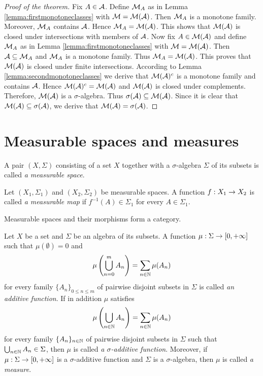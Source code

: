 \begin{proof}[Proof of the theorem]
Fix $A\in {\mathcal A}$. Define ${\mathcal M}_A$ as in Lemma \ref{lemma:firstmonotoneclasses} with ${\mathcal M} = {\mathcal M}({\mathcal A})$. Then ${\mathcal M}_A$ is a monotone family. Moreover, ${\mathcal M}_A$ contains ${\mathcal A}$. Hence ${\mathcal M}_A={\mathcal M}({\mathcal A})$. This shows that ${\mathcal M}({\mathcal A})$ is closed under intersections with members of ${\mathcal A}$. Now fix $A\in {\mathcal M}({\mathcal A})$ and define ${\mathcal M}_A$ as in Lemma \ref{lemma:firstmonotoneclasses} with ${\mathcal M} = {\mathcal M}({\mathcal A})$. Then ${\mathcal A}\subseteq {\mathcal M}_A$ and ${\mathcal M}_A$ is a monotone family. Thus ${\mathcal M}_A={\mathcal M}({\mathcal A})$. This proves that ${\mathcal M}({\mathcal A})$ is closed under finite intersections. According to Lemma \ref{lemma:secondmonotoneclasses} we derive that ${\mathcal M}({\mathcal A})^c$ is a monotone family and contains ${\mathcal A}$. Hence ${\mathcal M}({\mathcal A})^c={\mathcal M}({\mathcal A})$ and ${\mathcal M}({\mathcal A})$ is closed under complements. Therefore, ${\mathcal M}({\mathcal A})$ is a $\sigma$-algebra. Thus $\sigma({\mathcal A})\subseteq {\mathcal M}({\mathcal A})$. Since it is clear that ${\mathcal M}({\mathcal A})\subseteq \sigma({\mathcal A})$, we derive that ${\mathcal M}({\mathcal A})=\sigma({\mathcal A})$.
\end{proof}

\section{Measurable spaces and measures}

\begin{definition}
A pair $(X,\Sigma)$ consisting of a set $X$ together with a $\sigma$-algebra $\Sigma$ of its subsets is called \textit{a measurable space}.
\end{definition}

\begin{definition}
Let $(X_1,\Sigma_1)$ and $(X_2,\Sigma_2)$ be measurable spaces. A function $f:X_1\rightarrow X_2$ is called \textit{a measurable map} if $f^{-1}(A)\in \Sigma_1$ for every $A\in \Sigma_1$.
\end{definition}
\noindent
Measurable spaces and their morphisms form a category. 

\begin{definition}
Let $X$ be a set and $\Sigma$ be an algebra of its subsets. A function $\mu:\Sigma \rightarrow [0,+\infty]$ such that $\mu(\emptyset)=0$ and 
$$\mu\left(\bigcup_{n=0}^mA_n\right)=\sum_{n\in {\mathbb N}}\mu(A_n)$$
for every family  $\{A_n\}_{0\leq n\leq m}$ of pairwise disjoint subsets in $\Sigma$ is called \textit{an additive function}. If in addition $\mu$ satisfies
$$\mu\left(\bigcup_{n\in {\mathbb N}}A_n\right)=\sum_{n\in {\mathbb N}}\mu(A_n)$$
for every family  $\{A_n\}_{n\in {\mathbb N}}$ of pairwise disjoint subsets in $\Sigma$ such that $\bigcup_{n\in {\mathbb N}}A_n\in \Sigma$, then $\mu$ is called \textit{a $\sigma$-additive function}. Moreover, if $\mu:\Sigma \rightarrow [0,+\infty]$ is a $\sigma$-additive function and $\Sigma$ is a $\sigma$-algebra, then $\mu$ is called \textit{a measure}. 
\end{definition}

